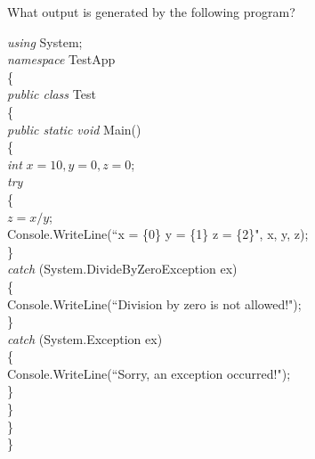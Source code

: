 {\begin{list}{E \thechapter.\theenumi}

\item What output is generated by the following program?

\emph{using} System;\\
\emph{namespace} TestApp\\
\{\\
\hspace*{0.2in} \emph{public class} Test\\
\hspace*{0.2in}   \{\\
\hspace*{0.4in}        \emph{public static void} Main()\\
\hspace*{0.4in}        \{\\
\hspace*{0.6in}            \emph{int} $x = 10, y = 0, z = 0$;\\
\hspace*{0.6in}            \emph{try}\\
\hspace*{0.6in}            \{\\
\hspace*{0.8in}                $z = x / y$;\\
\hspace*{0.8in}            Console.WriteLine(``x = \{0\}  y =
\{1\}  z = \{2\}", x, y, z);\\
\hspace*{0.6in}            \}\\
\hspace*{0.6in}            \emph{catch} (System.DivideByZeroException ex)\\
\hspace*{0.6in}            \{\\
\hspace*{0.8in}                Console.WriteLine(``Division by
zero is not allowed!");\\
\hspace*{0.6in}            \}\\
\hspace*{0.6in}            \emph{catch} (System.Exception ex)\\
\hspace*{0.6in}            \{\\
\hspace*{0.8in}                Console.WriteLine(``Sorry, an
exception occurred!");\\
\hspace*{0.6in}            \}\\
\hspace*{0.4in}        \}\\
\hspace*{0.2in}    \}\\
\}


\end{list}}
